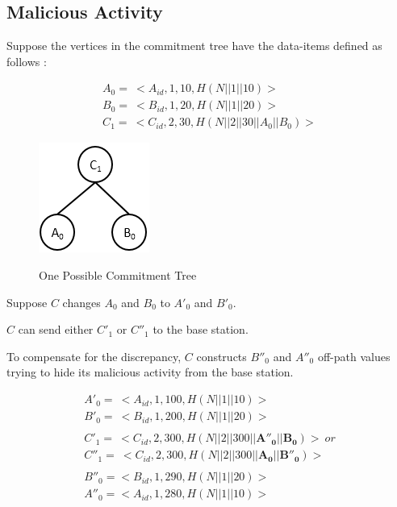 \documentclass[%
  slidesonly,%
  semlayer%
  ]{seminar}                                  %
\begin{document}
\begin{slide}
    \subsection*{Malicious Activity}

        Suppose the vertices in the commitment tree have the data-items defined as follows :
        
        \begin{equation*}
          \begin{array}{l}
            A_{0} =\ <A_{id},1,10, H(N||1||10)>\\
            B_{0} =\ <B_{id},1,20, H(N||1||20)>\\
            C_{1} =\ <C_{id},2,30, H(N||2||30||A_{0}||B_{0})>
          \end{array}
        \end{equation*}

        \begin{figure}
          \centering
          \includegraphics[scale=0.6]{images/commitment-tree-2.png}
          \label{fig:smallest-ct}
          \tiny{\caption{One Possible Commitment Tree}}
        \end{figure}
        \vfill
        \clearpage

        Suppose $C$ changes $A_{0}$ and $B_{0}$ to $A'_{0}$ and $B'_{0}$.

        $C$ can send either $C'_{1}$ or $C''_{1}$ to the base station.
        
        To compensate for the discrepancy, $C$ constructs $B''_{0}$ and $A''_{0}$ off-path values trying to hide its malicious activity from the base station.

        \begin{equation*}
          \begin{array}{l}
            A'_{0} =\ <A_{id},1,100, H(N||1||10)>\\
            B'_{0} =\ <B_{id},1,200, H(N||1||20)>\\
            \\
            C'_{1} =\ <C_{id},2,300, H(N||2||300||\mathbf{A''_{0}}||\mathbf{B_{0}})>\ or \\ 
            C''_{1} =\ <C_{id},2,300, H(N||2||300||\mathbf{A_{0}}||\mathbf{B''_{0}})>\\
            \\
            B''_{0} = <B_{id},1,290,H(N||1||20)>\\
            A''_{0} = <A_{id},1,280,H(N||1||10)>
          \end{array}
        \end{equation*}
        \vfill
        \clearpage


\end{slide}
\end{document}
